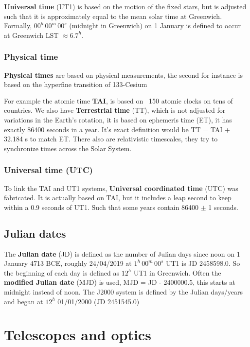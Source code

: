 \documentclass[a4paper]{article}
\begin{document}
\textbf{Universal time} (UT1) is based on the motion of the fixed stars, but is adjusted such that it is approximately equal to the mean solar time at Greenwich. Formally, $00^h\,00^m\,00^s$ (midnight in Greenwich) on 1 January is defined to occur at Greenwich LST $\approx 6.7^h$.

\subsubsection*{Physical time}

\textbf{Physical times} are based on physical measurements, the second for instance is based on the hyperfine transition of 133-Cesium

\bigskip

For example the atomic time \textbf{TAI}, is based on ~150 atomic clocks on tens of countries. We also have \textbf{Terrestrial time} (TT), which is not adjusted for variations in the Earth's rotation, it is based on ephemeris time (ET), it has exactly 86400 seconds in a year. It's exact definition would be TT = TAI + 32.184 s to match ET. There also are relativistic timescales, they try to synchronize times across the Solar System.

\subsubsection*{Universal time (UTC)}

To link the TAI and UT1 systems, \textbf{Universal coordinated time} (UTC) was fabricated. It is actually based on TAI, but it includes a leap second to keep within a 0.9 seconds of UT1. Such that some years contain 86400 $\pm$ 1 seconds.

\subsection{Julian dates}

The \textbf{Julian date} (JD) is defined as the number of Julian days since noon on 1 January 4713 BCE, roughly 24/04/2019 at $1^h\,00^m\,00^s$ UT1 is JD 2458598.0. So the beginning of each day is defined as $12^h$ UT1 in Greenwich. Often the \textbf{modified Julian date} (MJD) is used, MJD = JD - 2400000.5, this starts at midnight instead of noon. The J2000 system is defined by the Julian days/years and began at $12^h$ 01/01/2000 (JD 2451545.0)

\section{Telescopes and optics}
\end{document}
